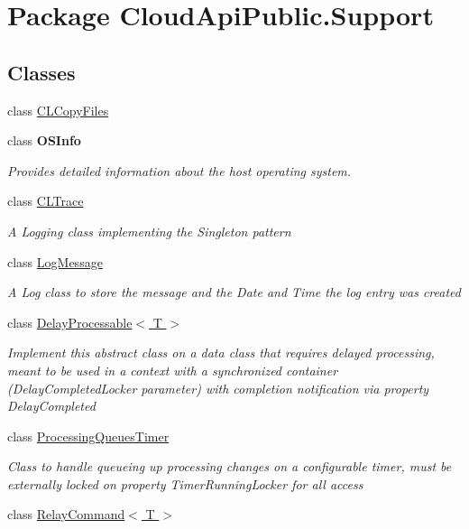 \hypertarget{namespace_cloud_api_public_1_1_support}{\section{Package Cloud\-Api\-Public.\-Support}
\label{namespace_cloud_api_public_1_1_support}
}
\subsection*{Classes}
\begin{DoxyCompactItemize}
\item 
class \hyperlink{class_cloud_api_public_1_1_support_1_1_c_l_copy_files}{C\-L\-Copy\-Files}
\item 
class {\bfseries O\-S\-Info}
\begin{DoxyCompactList}\small\item\em Provides detailed information about the host operating system. \end{DoxyCompactList}\item 
class \hyperlink{class_cloud_api_public_1_1_support_1_1_c_l_trace}{C\-L\-Trace}
\begin{DoxyCompactList}\small\item\em A Logging class implementing the Singleton pattern \end{DoxyCompactList}\item 
class \hyperlink{class_cloud_api_public_1_1_support_1_1_log_message}{Log\-Message}
\begin{DoxyCompactList}\small\item\em A Log class to store the message and the Date and Time the log entry was created \end{DoxyCompactList}\item 
class \hyperlink{class_cloud_api_public_1_1_support_1_1_delay_processable_3_01_t_01_4}{Delay\-Processable$<$ T $>$}
\begin{DoxyCompactList}\small\item\em Implement this abstract class on a data class that requires delayed processing, meant to be used in a context with a synchronized container (Delay\-Completed\-Locker parameter) with completion notification via property Delay\-Completed \end{DoxyCompactList}\item 
class \hyperlink{class_cloud_api_public_1_1_support_1_1_processing_queues_timer}{Processing\-Queues\-Timer}
\begin{DoxyCompactList}\small\item\em Class to handle queueing up processing changes on a configurable timer, must be externally locked on property Timer\-Running\-Locker for all access \end{DoxyCompactList}\item 
class \hyperlink{class_cloud_api_public_1_1_support_1_1_relay_command_3_01_t_01_4}{Relay\-Command$<$ T $>$}
\end{DoxyCompactItemize}
